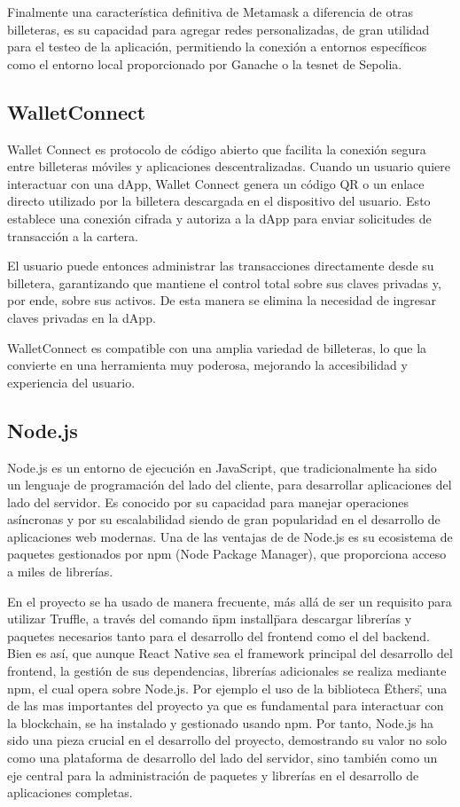 Finalmente una característica definitiva de Metamask a diferencia de otras billeteras, es su capacidad para agregar redes personalizadas, de gran utilidad para el testeo de la aplicación, permitiendo la conexión a entornos específicos como el entorno local proporcionado por Ganache o la tesnet de Sepolia.


\subsection{WalletConnect}

Wallet Connect es protocolo de código abierto que facilita la conexión segura entre billeteras móviles y aplicaciones descentralizadas.
Cuando un usuario quiere interactuar con una dApp, Wallet Connect genera un código QR o un enlace directo utilizado por la billetera descargada en el dispositivo del usuario. Esto establece una conexión cifrada y autoriza a la dApp para enviar solicitudes de transacción a la cartera.

El usuario puede entonces administrar las transacciones directamente desde su billetera, garantizando que mantiene el control total sobre sus claves privadas y, por ende, sobre sus activos. 
De esta manera se elimina la necesidad de ingresar claves privadas en la dApp.

WalletConnect es compatible con una amplia variedad de billeteras, lo que la convierte en una herramienta muy poderosa, mejorando la accesibilidad y experiencia del usuario.


\subsection{Node.js}

Node.js es un entorno de ejecución en JavaScript, que tradicionalmente ha sido un lenguaje de programación del lado del cliente, para desarrollar aplicaciones del lado del servidor. Es conocido por su capacidad para manejar operaciones asíncronas y por su escalabilidad siendo de gran popularidad en el desarrollo de aplicaciones web modernas. Una de las ventajas de de Node.js es su ecosistema de paquetes gestionados por npm (Node Package Manager), que proporciona acceso a miles de librerías.

En el proyecto se ha usado de manera frecuente, más allá de ser un requisito para utilizar Truffle, a través del comando \"npm install\" para descargar librerías y paquetes necesarios tanto para el desarrollo del frontend como el del backend.
Bien es así, que aunque React Native sea el framework principal del desarrollo del frontend, la gestión de sus dependencias, librerías adicionales se realiza mediante npm, el cual opera sobre Node.js.
Por ejemplo el uso de la biblioteca \"Ethers\", una de las mas importantes del proyecto ya que es fundamental para interactuar con la blockchain, se ha instalado y gestionado usando npm.
Por tanto, Node.js ha sido una pieza crucial en el desarrollo del proyecto, demostrando su valor no solo como una plataforma de desarrollo del lado del servidor, sino también como un eje central para la administración de paquetes y librerías en el desarrollo de aplicaciones completas.


